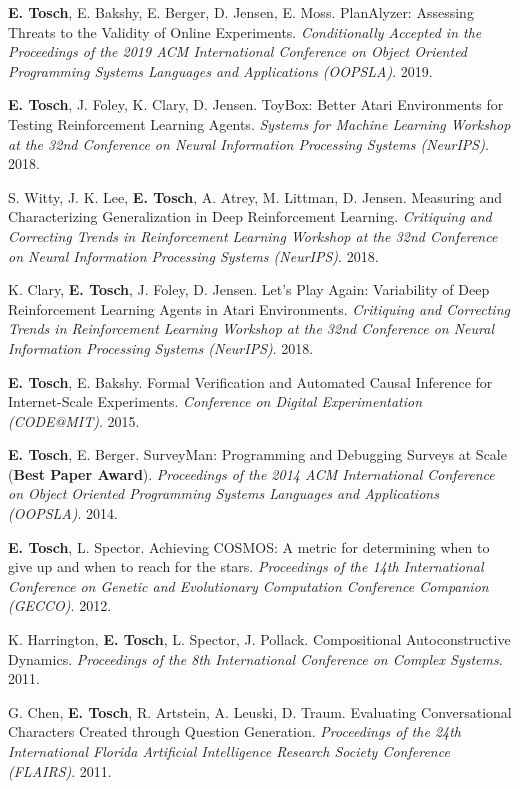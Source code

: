 \documentclass[10pt]{article}
\newcommand{\cvsec}[2]{
    \begin{tcolorbox}[width=\textwidth, breakable, title={#1}]
        #2
    \end{tcolorbox}
    \vspace{10pt}
}
\newcommand{\pub}[4]{
  \parbox{\textwidth}{
    #1. #2. \textit{#3}. #4.
    \vspace{5pt}
  }
}
\newcommand{\me}{\textbf{E. Tosch}}
\begin{document}
\cvsec{Publications}{
  \pub{\me{}, E. Bakshy, E. Berger, D. Jensen, E. Moss}{PlanAlyzer: Assessing Threats to the Validity of Online Experiments}{Conditionally Accepted in the Proceedings of the 2019 ACM International Conference on Object Oriented Programming Systems Languages and Applications (OOPSLA)}{2019}
  \pub{\me{}, J. Foley, K. Clary, D. Jensen}{ToyBox: Better Atari Environments for Testing Reinforcement Learning Agents}{Systems for Machine Learning Workshop at the 32nd Conference on Neural Information Processing Systems (NeurIPS)}{2018}
  \pub{S. Witty, J. K. Lee, \me{}, A. Atrey, M. Littman, D. Jensen}{Measuring and Characterizing Generalization in Deep Reinforcement Learning}{Critiquing and Correcting Trends in Reinforcement Learning Workshop at the 32nd Conference on Neural Information Processing Systems (NeurIPS)}{2018}
  \pub{K. Clary, \me{}, J. Foley, D. Jensen}{Let's Play Again: Variability of Deep Reinforcement Learning Agents in Atari Environments}{Critiquing and Correcting Trends in Reinforcement Learning Workshop at the 32nd Conference on Neural Information Processing Systems (NeurIPS)}{2018}
  \pub{\me{}, E. Bakshy}{Formal Verification and Automated Causal Inference for Internet-Scale Experiments}{Conference on Digital Experimentation (CODE@MIT)}{2015}
  \pub{\me{}, E. Berger}{SurveyMan: Programming and Debugging Surveys at Scale (\textbf{Best Paper Award})}{Proceedings of the 2014 ACM International Conference on Object Oriented Programming Systems Languages and Applications (OOPSLA)}{2014}
  \pub{\me{}, L. Spector}{Achieving COSMOS: A metric for determining when to give up and when to reach for the stars}{Proceedings of the 14th International Conference on Genetic and Evolutionary Computation Conference Companion (GECCO)}{2012}
  \pub{K. Harrington, \me{}, L. Spector, J. Pollack}{Compositional Autoconstructive Dynamics}{Proceedings of the 8th International Conference on Complex Systems}{2011}
  \pub{G. Chen, \me{}, R. Artstein, A. Leuski, D. Traum}{Evaluating Conversational Characters Created through Question Generation}{Proceedings of the 24th International Florida Artificial Intelligence Research Society Conference (FLAIRS)}{2011}
}
\end{document}
